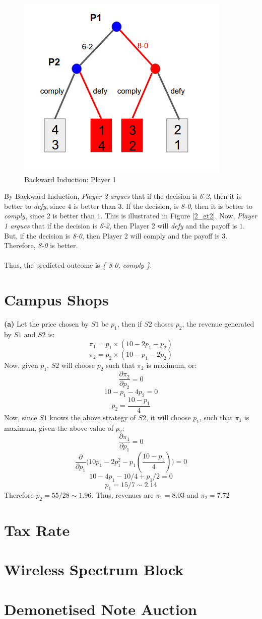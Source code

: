 \documentclass{article}
\begin{document}
\begin{figure}[h!]
\begin{multicols}{3}
\includegraphics[width=1\columnwidth]{2_gt3.png}
\caption{Backward Induction: Player 1}
\label{2_gt3}
\end{multicols}
\end{figure}

By Backward Induction, \emph{Player 2 argues} that if the decision is \emph{6-2}, then it is better to \emph{defy}, since $4$ is better than $3$. If the decision, is \emph{8-0}, then it is better to \emph{comply}, since $2$ is better than $1$. This is illustrated in Figure \ref{2_gt2}. Now, \emph{Player 1 argues} that if the decision is \emph{6-2}, then Player 2 will \emph{defy} and the payoff is $1$. But, if the decision is \emph{8-0}, then Player 2 will comply and the payoff is $3$. Therefore, \emph{8-0} is better. \\ \\
Thus, the predicted outcome is \emph{\{ 8-0, comply \}}.

\section{Campus Shops}
\textbf{(a)} Let the price chosen by $S1$ be $p_1$, then if $S2$ choses $p_2$, the revenue generated by $S1$ and $S2$ is: 
$$\pi_{1} = p_1 \times (10-2p_1-p_2)$$
$$\pi_{2} = p_2 \times (10-p_1-2p_2)$$
Now, given $p_1$, $S2$ will choose $p_2$ such that $\pi_2$ is maximum, or:
$$\frac{\partial \pi_2}{\partial p_2}= 0$$
$$ 10 - p_1 -4p_2  = 0$$
$$p_2 = \frac{10-p_1}{4}$$
Now, since $S1$ knows the above strategy of $S2$, it will choose $p_1$, such that $\pi_1$ is maximum, given the above value of $p_2$:
$$\frac{\partial \pi_1}{\partial p_1}= 0$$
$$\frac{\partial}{\partial p_1}\Big(10p_1 - 2p_1^2 -p_1(\frac{10-p_1}{4})\Big)= 0$$
$$10 - 4p_1 - 10/4 + p_1/2 = 0$$
$$p_1 = 15/7 \sim 2.14$$
Therefore $p_2 = 55/28 \sim 1.96$. Thus, revenues are $\pi_1 = 8.03$ and $\pi_2 = 7.72$
\section{Tax Rate}
\section{Wireless Spectrum Block}
\section{Demonetised Note Auction}
\end{document}
